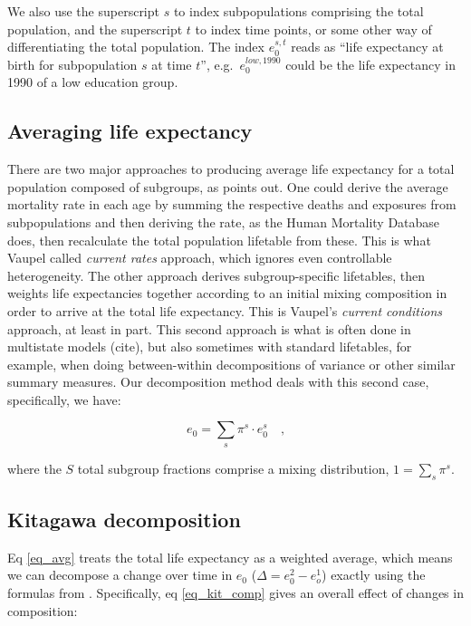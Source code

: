 \documentclass[sn-apa,pdflatex]{sn-jnl}
\theoremstyle{remark}
\theoremstyle{definition}
\begin{document}
We also use the superscript \(s\) to index subpopulations comprising the
total population, and the superscript \(t\) to index time points, or
some other way of differentiating the total population. The index
\(e^{s,t}_0\) reads as ``life expectancy at birth for subpopulation
\(s\) at time \(t\)'', e.g.~\(e^{low, 1990}_0\) could be the life
expectancy in 1990 of a low education group.

\hypertarget{averaging-life-expectancy}{%
\subsection{Averaging life expectancy}\label{averaging-life-expectancy}}

There are two major approaches to producing average life expectancy for
a total population composed of subgroups, as \citet{vaupel2002life}
points out. One could derive the average mortality rate in each age by
summing the respective deaths and exposures from subpopulations and then
deriving the rate, as the Human Mortality Database
\citet{wilmoth2021methods} does, then recalculate the total population
lifetable from these. This is what Vaupel called \emph{current rates}
approach, which ignores even controllable heterogeneity. The other
approach derives subgroup-specific lifetables, then weights life
expectancies together according to an initial mixing composition in
order to arrive at the total life expectancy. This is Vaupel's
\emph{current conditions} approach, at least in part. This second
approach is what is often done in multistate models (cite), but also
sometimes with standard lifetables, for example, when doing
between-within decompositions of variance or other similar summary
measures. Our decomposition method deals with this second case,
specifically, we have:

\begin{equation}
\label{eq_avg}
e_0 = \sum_s \pi^s \cdot e_0^s \quad \textrm{,}
\end{equation}

\noindent where the \(S\) total subgroup fractions comprise a mixing
distribution, \(1 = \sum_s \pi^s\).

\hypertarget{kitagawa-decomposition}{%
\subsection{Kitagawa decomposition}\label{kitagawa-decomposition}}

Eq \eqref{eq_avg} treats the total life expectancy as a weighted
average, which means we can decompose a change over time in \(e_0\)
(\(\Delta = e_0^2 - e_o^1\)) exactly using the formulas from
\citet{kitagawa1955components}. Specifically, eq \eqref{eq_kit_comp}
gives an overall effect of changes in composition:
\end{document}
